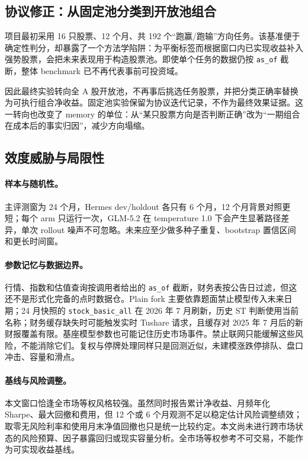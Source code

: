 \documentclass[11pt]{article}
\begin{document}
\subsection{协议修正：从固定池分类到开放池组合}

项目最初采用 16 只股票、12 个月、共 192 个``跑赢/跑输''方向任务。该基准便于确定性判分，却暴露了一个方法学陷阱：为平衡标签而根据窗口内已实现收益补入强势股票，会把未来表现用于构造股票池。即使单个任务的数据仍按 \texttt{as\_of} 截断，整体 benchmark 已不再代表事前可投资域。

因此最终实验转向全 A 股开放池，不再事后挑选任务股票，并把分类正确率替换为可执行组合净收益。固定池实验保留为协议迭代记录，不作为最终效果证据。这一转向也改变了 memory 的单位：从``某只股票方向是否判断正确''改为``一期组合在成本后的事实归因''，减少方向塌缩。

\subsection{效度威胁与局限性}
\label{sec:limitations}

\paragraph{样本与随机性。}
主评测窗为 24 个月，Hermes dev/holdout 各只有 6 个月，12 个月背景对照更短；每个 arm 只运行一次，GLM-5.2 在 temperature 1.0 下会产生显著路径差异，单次 rollout 噪声不可忽略。未来应至少做多种子重复、bootstrap 置信区间和更长时间窗。

\paragraph{参数记忆与数据边界。}
行情、指数和估值查询按调用者给出的 \texttt{as\_of} 截断，财务表按公告日过滤，但这还不是形式化完备的点时数据仓。Plain fork 主要依靠题面禁止模型传入未来日期；24 月快照的 \texttt{stock\_basic\_all} 在 2026 年 7 月刷新，历史 ST 判断使用当前名称；财务缓存缺失时可能触发实时 Tushare 请求，且缓存对 2025 年 7 月后的新财报覆盖有限。基座模型参数也可能记住历史市场事件。禁止联网只能缓解这些风险，不能消除它们。复权与停牌处理同样只是回测近似，未建模涨跌停排队、盘口冲击、容量和滑点。

\paragraph{基线与风险调整。}
本文窗口恰逢全市场等权风格较强。虽然同时报告累计净收益、月频年化 Sharpe、最大回撤和费用，但 12 个或 6 个月观测不足以稳定估计风险调整绩效；取零无风险利率和使用月末净值回撤也只是统一比较约定。本文尚未进行跨市场状态的风险预算、因子暴露回归或现实容量分析。全市场等权参考不可交易，不能作为可实现收益基线。
\end{document}
